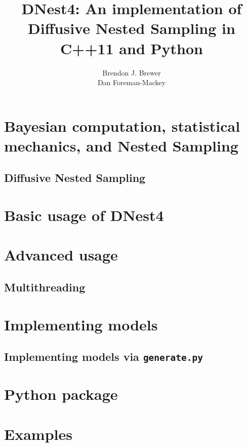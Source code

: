 \documentclass[a4paper, 12pt]{article}
\title{DNest4: An implementation of Diffusive Nested Sampling
in C++11 and Python}
\author{Brendon J. Brewer\\
Dan Foreman-Mackey}
\date{}
\begin{document}
\maketitle


\setlength{\parindent}{0pt}
\setlength{\parskip}{8pt}

\section{Bayesian computation, statistical mechanics, and Nested Sampling}


\subsection{Diffusive Nested Sampling}



\section{Basic usage of DNest4}

\section{Advanced usage}

\subsection{Multithreading}

\section{Implementing models}

\subsection{Implementing models via {\tt generate.py}}

\section{Python package}


\section{Examples}
\end{document}
